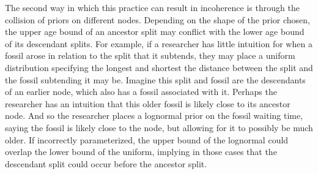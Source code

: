 \documentclass{article}
\begin{document}
The second way in which this practice can result in incoherence is through the collision of priors on different nodes.
Depending on the shape of the prior chosen,  the upper age bound of an ancestor split may conflict with the lower age bound of its descendant splits. 
For example, if a researcher has little intuition for when a fossil arose in relation to the split that it subtends, they may place a uniform distribution specifying the longest and shortest the distance between the split and the fossil subtending it may be.
Imagine this split and fossil are the descendants of an earlier node, which also has a fossil associated with it. 
Perhaps the researcher has an intuition that this older fossil is likely close to its ancestor node. 
And so the researcher places a lognormal prior on the fossil waiting time, saying the fossil is likely close to the node, but allowing for it to possibly be much older. 
If incorrectly parameterized, the upper bound of the lognormal could overlap the lower bound of the uniform, implying in those cases that the descendant split could occur before the ancestor split.
\end{document}
